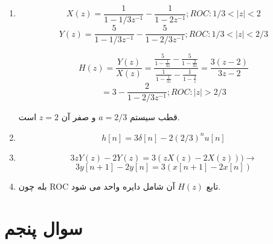 \documentclass[12pt]{article}
\begin{document}
\begin{enumerate}[label = \Alph*)]
	\item 

$$X(z) = \frac{1}{1-1/3 z^{-1}} - \frac{1}{1- 2 z^{-1}} ; ROC: 1/3<|z|<2$$
$$Y(z)= \frac{5}{1 - 1/3 z^{-1}} - \frac{5}{1 - 2/3 z^{-1}} ; ROC: 1/3 < |z| <2/3$$

$$H(z) = \frac{Y(z)}{X(z)} =\frac{\frac{5}{1-\frac{1}{3 z}}-\frac{5}{1-\frac{2}{3 z}}}{\frac{1}{1-\frac{1}{3 z}}-\frac{1}{1-\frac{2}{z}}} =\frac{3 (z-2)}{3 z-2}$$
$$=3 - \frac{2}{1 - 2/3 z^{-1}} ; ROC: |z| > 2/3  $$


قطب سیستم $a = 2/3$ و صفر آن $z=2$ است.


\item
$$h[n] = 3\delta[n] - 2 (2/3)^n u[n]$$


\item

$$3z Y(z) -2 Y(z) = 3(zX(z) - 2 X(z))) \rightarrow$$
$$3 y[n+1] - 2y[n] = 3(x[n+1] - 2x[n])$$

\item

بله چون ROC تابع $H(z)$ آن شامل دایره واحد می شود.
\end{enumerate}

\section{سوال پنجم}
\end{document}
